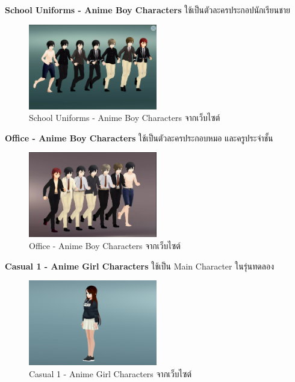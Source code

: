 \subsubitem \textbf{School Uniforms - Anime Boy Characters} \cite{School-Uniforms-Anime-Boy-Characters:asset} ใช้เป็นตัวละครประกอปนักเรียนชาย
\begin{figure}[h]
  \centering
  \includegraphics[width=0.5\textwidth, height=0.15\textheight]{Images/School Uniforms - Anime Boy Characters.png}
  \caption{School Uniforms - Anime Boy Characters จากเว็บไซต์} \label{School Uniforms - Anime Boy Characters}
\end{figure} 


\subsubitem \textbf{Office - Anime Boy Characters} \cite{Office-Anime-Boy-Characters:asset} ใช้เป็นตัวละครประกอบหมอ และครูประจำชั้น
\begin{figure}
  \centering
  \includegraphics[width=0.5\textwidth, height=0.15\textheight]{Images/Office - Anime Boy Characters.png}
  \caption{Office - Anime Boy Characters จากเว็บไซต์} \label{Office - Anime Boy Characters}
\end{figure}


\subsubitem \textbf{Casual 1 - Anime Girl Characters} \cite{anime-girl:asset} ใช้เป็น Main Character ในรุ่นทดลอง
\begin{figure}[h]
  \centering
  \includegraphics[width=0.5\textwidth, height=0.15\textheight]{Images/7c8d1857-1f28-440d-a966-2c09fe1db214_orig.png}
  \caption{Casual 1 - Anime Girl Characters จากเว็บไซต์}\label{AnimeGirl}
\end{figure}

